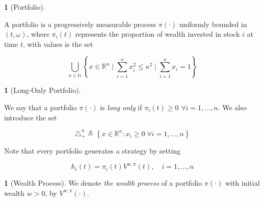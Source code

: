 \documentclass[british]{amsart}
\numberwithin{equation}{section}
\numberwithin{figure}{section}
\theoremstyle{plain}
\theoremstyle{definition}
\newtheorem{defn}[thm]{\protect\definitionname}
\theoremstyle{plain}
\theoremstyle{plain}
\theoremstyle{plain}
\theoremstyle{remark}
\newtheorem{rem}[thm]{\protect\remarkname}
\theoremstyle{plain}
\providecommand{\definitionname}{Definition}
\providecommand{\remarkname}{Remark}
\newcommand{\defeq}{\mathop{\triangleq}}
\newcommand{\rangei}{i=1,\dots,n}
\begin{document}
\begin{defn} [Portfolio]
	\label{def:portfolio}

	A portfolio is a progressively measurable process $\pi(\cdot)$ uniformly bounded in 
	$(t,\omega)$,	where $\pi_{i}(t)$ represents the proportion of wealth invested in stock 
	$i$ at time $t$, with values is the set

	\begin{equation}
		\bigcup_{\kappa \in \mathbb{N}} 
		\left\{ 
			x \in \mathbb{R}^{n} \mid 
			\sum_{i=1}^{n} x_{i}^2 \le \kappa^2 \mid
			\sum_{i=1}^{n} x_{i} = 1
		\right\} 
 	\end{equation}
\end{defn}

\begin{defn} [Long-Only Portfolio]
	\label{def:longonlyportfolio}

	We say that a portfolio $\pi(\cdot)$ is \textit{long only} if 
	$\pi_{i}(t) \ge 0$ $\forall \rangei$. We also introduce the set 

	\begin{equation}
		\triangle_{+}^{n} \defeq 
		\left\{ x\in\mathbb{R}^{n}:x_{i}\ge0\;\forall \rangei \right\} 
 	\end{equation}

\end{defn}

Note that every portfolio generates a strategy by setting 

\begin{equation}
	\label{eq:wealthinvestedbyportfolio}
	h_i(t) = \pi_{i}(t)V^{w,\pi}(t),
	\quad \rangei
\end{equation}

\begin{defn} [Wealth Process]
	
	We denote \textit{the wealth process} of a portfolio $\pi(\cdot)$ with initial 
	wealth $w > 0$, by $V^{w,\pi}(\cdot)$.

\end{defn}

 
\end{document}
